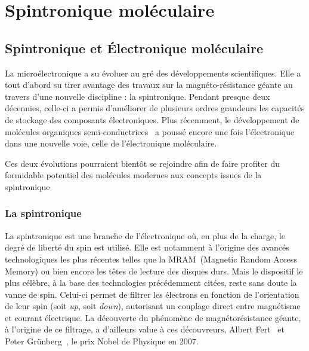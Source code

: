 \chapter{Spintronique moléculaire}

\section{Spintronique et Électronique moléculaire}
La microélectronique a su évoluer au gré des développements scientifiques. Elle a tout d'abord su tirer avantage des travaux sur la magnéto-résistance géante au travers d'une nouvelle discipline : la spintronique. Pendant presque deux décennies, celle-ci a permis d'améliorer de plusieurs ordres grandeurs les capacités de stockage des composants électroniques. Plus récemment, le développement de molécules organiques semi-conductrices~\cite{Tsumura1986,Horowitz1990,Lin1997} a poussé encore une fois l'électronique dans une nouvelle voie, celle de l'électronique moléculaire.

Ces deux évolutions pourraient bientôt se rejoindre afin de faire profiter du formidable potentiel des molécules modernes aux concepts issues de la spintronique

\subsection{La spintronique}
La spintronique est une branche de l'électronique où, en plus de la charge, le degré de liberté du spin est utilisé. Elle est notamment à l'origine des avancés technologiques les plus récentes telles que la MRAM~(Magnetic Random Access Memory) ou bien encore les têtes de lecture des disques durs. Mais le dispositif le plus célèbre, à la base des technologies précédemment citées, reste sans doute la vanne de spin. Celui-ci permet de filtrer les électrons en fonction de l'orientation de leur spin (soit \textit{up}, soit \textit{down}), autorisant un couplage direct entre magnétisme et courant électrique. La découverte du phénomène de magnétorésistance géante, à l'origine de ce filtrage, a d'ailleurs value à ces découvreurs, Albert Fert~\cite{Baibich1988} et Peter Grünberg~\cite{Gruenberg1986}, le prix Nobel de Physique en 2007.

